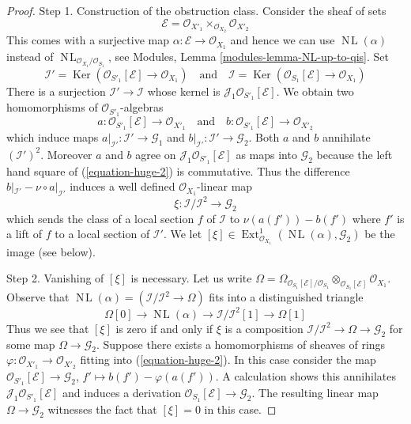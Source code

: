 \documentclass[10pt,a4paper]{amsart}
\theoremstyle{plain}
\theoremstyle{definition}
\theoremstyle{remark}
\numberwithin{equation}{subsection}
\def\Ext{\mathop{\mathrm{Ext}}\nolimits}
\def\NL{\mathop{N\!L}\nolimits}
\def\Ker{\mathop{\mathrm{Ker}}}
\begin{document}
\begin{proof}
\medskip\noindent
Step 1. Construction of the obstruction class. Consider the sheaf
of sets
$$
\mathcal{E} = \mathcal{O}_{X'_1} \times_{\mathcal{O}_{X_2}} \mathcal{O}_{X'_2}
$$
This comes with a surjective map $\alpha : \mathcal{E} \to \mathcal{O}_{X_1}$
and hence we can use $\NL(\alpha)$ instead of
$\NL_{\mathcal{O}_{X_1}/\mathcal{O}_{S_1}}$, see
Modules, Lemma \ref{modules-lemma-NL-up-to-qis}.
Set
$$
\mathcal{I}' =
\Ker(\mathcal{O}_{S'_1}[\mathcal{E}] \to \mathcal{O}_{X_1})
\quad\text{and}\quad
\mathcal{I} =
\Ker(\mathcal{O}_{S_1}[\mathcal{E}] \to \mathcal{O}_{X_1})
$$
There is a surjection $\mathcal{I}' \to \mathcal{I}$ whose kernel
is $\mathcal{J}_1\mathcal{O}_{S'_1}[\mathcal{E}]$.
We obtain two homomorphisms of $\mathcal{O}_{S'_1}$-algebras
$$
a : \mathcal{O}_{S'_1}[\mathcal{E}] \to \mathcal{O}_{X'_1}
\quad\text{and}\quad
b : \mathcal{O}_{S'_1}[\mathcal{E}] \to \mathcal{O}_{X'_2}
$$
which induce maps $a|_{\mathcal{I}'} : \mathcal{I}' \to \mathcal{G}_1$ and
$b|_{\mathcal{I}'} : \mathcal{I}' \to \mathcal{G}_2$. Both $a$ and $b$
annihilate $(\mathcal{I}')^2$. Moreover $a$ and $b$ agree on
$\mathcal{J}_1\mathcal{O}_{S'_1}[\mathcal{E}]$ as maps into $\mathcal{G}_2$
because the left hand square of (\ref{equation-huge-2}) is commutative.
Thus the difference
$b|_{\mathcal{I}'} - \nu \circ a|_{\mathcal{I}'}$
induces a well defined $\mathcal{O}_{X_1}$-linear map
$$
\xi : \mathcal{I}/\mathcal{I}^2 \longrightarrow \mathcal{G}_2
$$
which sends the class of a local section $f$ of $\mathcal{I}$ to
$\nu(a(f')) - b(f')$ where $f'$ is a lift of $f$ to a local
section of $\mathcal{I}'$. We let
$[\xi] \in \Ext^1_{\mathcal{O}_{X_1}}(\NL(\alpha), \mathcal{G}_2)$
be the image (see below).

\medskip\noindent
Step 2. Vanishing of $[\xi]$ is necessary. Let us write
$\Omega = \Omega_{\mathcal{O}_{S_1}[\mathcal{E}]/\mathcal{O}_{S_1}}
\otimes_{\mathcal{O}_{S_1}[\mathcal{E}]} \mathcal{O}_{X_1}$.
Observe that $\NL(\alpha) = (\mathcal{I}/\mathcal{I}^2 \to \Omega)$
fits into a distinguished triangle
$$
\Omega[0] \to
\NL(\alpha) \to
\mathcal{I}/\mathcal{I}^2[1] \to
\Omega[1]
$$
Thus we see that $[\xi]$ is zero if and only if $\xi$
is a composition $\mathcal{I}/\mathcal{I}^2 \to \Omega \to \mathcal{G}_2$
for some map $\Omega \to \mathcal{G}_2$. Suppose there exists a
homomorphisms of sheaves of rings
$\varphi : \mathcal{O}_{X'_1} \to \mathcal{O}_{X'_2}$ fitting into
(\ref{equation-huge-2}). In this case consider the map
$\mathcal{O}_{S'_1}[\mathcal{E}] \to \mathcal{G}_2$,
$f' \mapsto b(f') - \varphi(a(f'))$. A calculation
shows this annihilates $\mathcal{J}_1\mathcal{O}_{S'_1}[\mathcal{E}]$
and induces a derivation $\mathcal{O}_{S_1}[\mathcal{E}] \to \mathcal{G}_2$.
The resulting linear map $\Omega \to \mathcal{G}_2$ witnesses the
fact that $[\xi] = 0$ in this case.


\end{proof}
\end{document}
